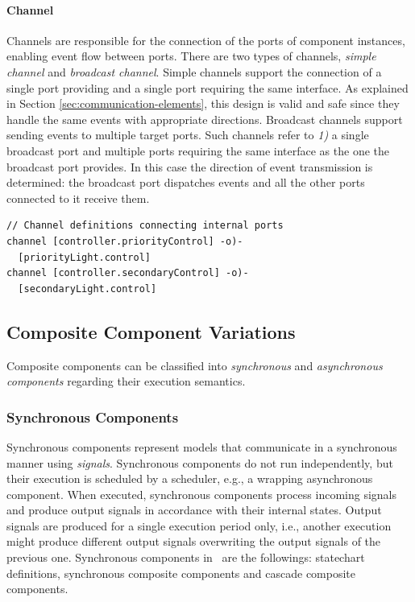 \paragraph{Channel} Channels are responsible for the connection of the ports of component instances, enabling event flow between ports. There are two types of channels, \emph{simple channel} and \emph{broadcast channel}. Simple channels support the connection of a single port providing and a single port
requiring the same interface. As explained in Section \ref{sec:communication-elements}, this design is valid and safe
since they handle the same events with appropriate directions. Broadcast channels support sending events to multiple target ports. Such channels refer
to \textit{1)} a single broadcast port and  multiple ports requiring the same interface as the
one the broadcast port provides. In this case the direction of event transmission is
determined: the broadcast port dispatches events and all the other ports connected to
it receive them.

\begin{lstlisting}
// Channel definitions connecting internal ports
channel [controller.priorityControl] -o)-
  [priorityLight.control]
channel [controller.secondaryControl] -o)-
  [secondaryLight.control]
\end{lstlisting}

\subsection{Composite Component Variations}
Composite components can be classified into \emph{synchronous} and \emph{asynchronous components} regarding their execution semantics.

\subsubsection{Synchronous Components}
Synchronous components represent models that communicate
in a synchronous manner using \emph{signals}. Synchronous components do not run independently, but their
execution is scheduled by a scheduler, e.g., a wrapping asynchronous component. When executed, synchronous components process incoming signals
and produce output signals in accordance with their internal states. Output signals are
produced for a single execution period only, i.e., another execution might produce different
output signals overwriting the output signals of the previous one. Synchronous components in \gamma\ are the followings:  statechart definitions, synchronous composite
components and cascade composite components.

